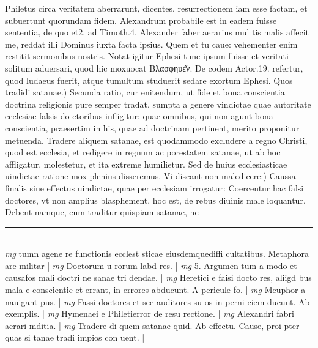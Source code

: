 \documentclass{article}
\begin{document}
\begin{pages}
Philetus circa veritatem aberrarunt, dicentes, resurrectionem iam esse factam, et subuertunt quorundam fidem. Alexandrum probabile est in eadem fuisse sententia, de quo et2. ad Timoth.4. Alexander faber aerarius mul tis malis affecit me, reddat illi Dominus iuxta facta ipsius. Quem et tu caue: vehementer enim restitit sermonibus nostris. Notat igitur Ephesi tunc ipsum fuisse et veritati solitum aduersari, quod hic moxuocat Βλασφηυε͂ν. De codem Actor.19. refertur, quod ludaeus fuerit, atque tumultum studuerit sedare exortum Ephesi.  \pend\pstart Quos tradidi satanae.) Secunda ratio, cur enitendum, ut fide et bona conscientia doctrina religionis pure semper tradat, sumpta a genere vindictae quae autoritate ecclesiae falsis do ctoribus infligitur: quae omnibus, qui non agunt bona conscientia, praesertim in his, quae ad doctrinam pertinent, merito proponitur metuenda. Tradere aliquem satanae, est quodammodo excludere a regno Christi, quod est ecclesia, et redigere in regnum ac porestatem satanae, ut ab hoc affligatur, molestetur, et ita extreme humilietur. Sed de huius ecclesiasticae uindictae ratione mox plenius disseremus.  \pend\pstart Vi discant non maledicere:) Caussa finalis siue effectus uindictae, quae per ecclesiam irrogatur: Coercentur hac falsi doctores, vt non amplius blasphement, hoc est, de rebus diuinis male loquantur. Debent namque, cum traditur quispiam satanae, ne\pend
\vspace{0.5cm}\noindent
\vspace{0.2cm}\rule{1cm}{0.2pt}\\ 
\hspace{0.2cm}\textit{mg}
\footnotesize tumn agene re functionis ecclest sticae eiusdemquediffi cultatibus. Metaphora are militar 
\normalsize| 
\hspace{0.2cm}\textit{mg}
\footnotesize Doctorum u rorum labd res. 
\normalsize| 
\hspace{0.2cm}\textit{mg}
\footnotesize 5. Argumen tum a modo et causafos mali doctri ne sanae tri dendae. 
\normalsize| 
\hspace{0.2cm}\textit{mg}
\footnotesize Heretici e faisi docto res, aliigd bus mala e conscientie et errant, in errores abducunt. A pericule fo. 
\normalsize| 
\hspace{0.2cm}\textit{mg}
\footnotesize Meuphor a nauigant pus. 
\normalsize| 
\hspace{0.2cm}\textit{mg}
\footnotesize Fassi doctores et see auditores su os in perni ciem ducunt. Ab exemplis. 
\normalsize| 
\hspace{0.2cm}\textit{mg}
\footnotesize Hymenaei e Philetierror de resu rectione. 
\normalsize| 
\hspace{0.2cm}\textit{mg}
\footnotesize Alexandri fabri aerari mditia. 
\normalsize| 
\hspace{0.2cm}\textit{mg}
\footnotesize Tradere di quem satanae quid. Ab effectu. Cause, proi pter quas si tanae tradi impios con uent. 
\normalsize| 

\end{pages}
\end{document}

